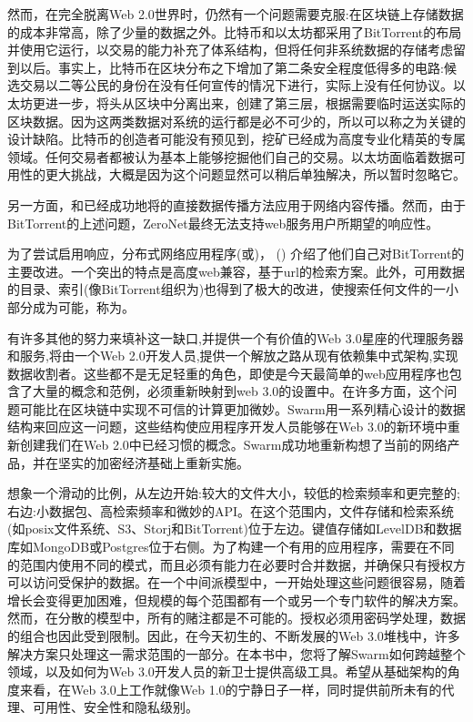 然而，在完全脱离Web 2.0世界时，仍然有一个问题需要克服:在区块链上存储数据的成本非常高，除了少量的数据之外。比特币和以太坊都采用了BitTorrent的布局并使用它运行，以交易的能力补充了体系结构，但将任何非系统数据的存储考虑留到以后。事实上，比特币在区块分布之下增加了第二条安全程度低得多的电路:候选交易以二等公民的身份在没有任何宣传的情况下进行，实际上没有任何协议。以太坊更进一步，将头从区块中分离出来，创建了第三层，根据需要临时运送实际的区块数据。因为这两类数据对系统的运行都是必不可少的，所以可以称之为关键的设计缺陷。比特币的创造者可能没有预见到，挖矿已经成为高度专业化精英的专属领域。任何交易者都被认为基本上能够挖掘他们自己的交易。以太坊面临着数据可用性的更大挑战，大概是因为这个问题显然可以稍后单独解决，所以暂时忽略它。 

另一方面，和\cite{zeronet}已经成功地将的直接数据传播方法应用于网络内容传播。然而，由于BitTorrent的上述问题，ZeroNet最终无法支持web服务用户所期望的响应性。

为了尝试启用响应，分布式网络应用程序(或)，  () \cite{ipfs2014}介绍了他们自己对BitTorrent的主要改进。一个突出的特点是高度web兼容，基于url的检索方案。此外，可用数据的目录、索引(像BitTorrent组织为)也得到了极大的改进，使搜索任何文件的一小部分成为可能，称为。

有许多其他的努力来填补这一缺口,并提供一个有价值的Web 3.0星座的代理服务器和服务,将由一个Web 2.0开发人员,提供一个解放之路从现有依赖集中式架构,实现数据收割者。这些都不是无足轻重的角色，即使是今天最简单的web应用程序也包含了大量的概念和范例，必须重新映射到web 3.0的设置中。在许多方面，这个问题可能比在区块链中实现不可信的计算更加微妙。Swarm用一系列精心设计的数据结构来回应这一问题，这些结构使应用程序开发人员能够在Web 3.0的新环境中重新创建我们在Web 2.0中已经习惯的概念。Swarm成功地重新构想了当前的网络产品，并在坚实的加密经济基础上重新实施。

想象一个滑动的比例，从左边开始:较大的文件大小，较低的检索频率和更完整的;右边:小数据包、高检索频率和微妙的API。在这个范围内，文件存储和检索系统(如posix文件系统、S3、Storj和BitTorrent)位于左边。键值存储如LevelDB和数据库如MongoDB或Postgres位于右侧。为了构建一个有用的应用程序，需要在不同的范围内使用不同的模式，而且必须有能力在必要时合并数据，并确保只有授权方可以访问受保护的数据。在一个中间派模型中，一开始处理这些问题很容易，随着增长会变得更加困难，但规模的每个范围都有一个或另一个专门软件的解决方案。然而，在分散的模型中，所有的赌注都是不可能的。授权必须用密码学处理，数据的组合也因此受到限制。因此，在今天初生的、不断发展的Web 3.0堆栈中，许多解决方案只处理这一需求范围的一部分。在本书中，您将了解Swarm如何跨越整个领域，以及如何为Web 3.0开发人员的新卫士提供高级工具。希望从基础架构的角度来看，在Web 3.0上工作就像Web 1.0的宁静日子一样，同时提供前所未有的代理、可用性、安全性和隐私级别。

